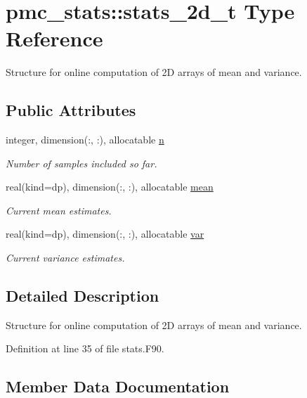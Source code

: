 \hypertarget{structpmc__stats_1_1stats__2d__t}{}\section{pmc\+\_\+stats\+:\+:stats\+\_\+2d\+\_\+t Type Reference}
\label{structpmc__stats_1_1stats__2d__t}


Structure for online computation of 2D arrays of mean and variance.  


\subsection*{Public Attributes}
\begin{DoxyCompactItemize}
\item 
integer, dimension(\+:, \+:), allocatable \mbox{\hyperlink{structpmc__stats_1_1stats__2d__t_a0e48a39cdca854ea5f86e33180952a20}{n}}
\begin{DoxyCompactList}\small\item\em Number of samples included so far. \end{DoxyCompactList}\item 
real(kind=dp), dimension(\+:, \+:), allocatable \mbox{\hyperlink{structpmc__stats_1_1stats__2d__t_a6f2fac0875a3ee00a691e59f15c0f17b}{mean}}
\begin{DoxyCompactList}\small\item\em Current mean estimates. \end{DoxyCompactList}\item 
real(kind=dp), dimension(\+:, \+:), allocatable \mbox{\hyperlink{structpmc__stats_1_1stats__2d__t_ab0d5bdb6fa2e1833e9c29553c0e3327f}{var}}
\begin{DoxyCompactList}\small\item\em Current variance estimates. \end{DoxyCompactList}\end{DoxyCompactItemize}


\subsection{Detailed Description}
Structure for online computation of 2D arrays of mean and variance. 

Definition at line 35 of file stats.\+F90.



\subsection{Member Data Documentation}
\mbox{\label{structpmc__stats_1_1stats__2d__t_a6f2fac0875a3ee00a691e59f15c0f17b}} 
